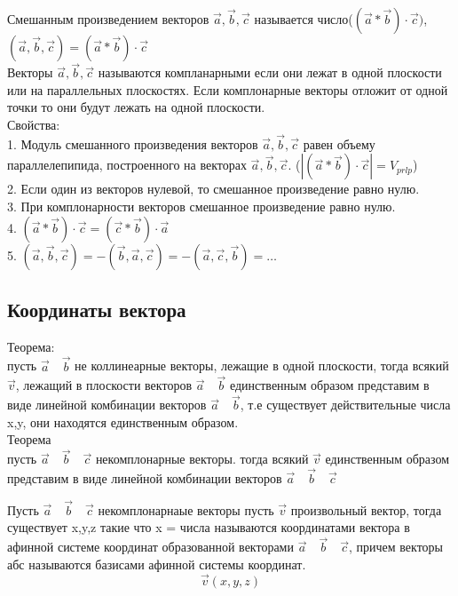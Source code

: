 \documentclass[a4paper, 12pt]{article}
\begin{document}
Смешанным произведением векторов $ \vec{a},\vec{b},\vec{c} $ называется число($ (\vec{a}*\vec{b})\cdot \vec{c}) $, $ (\vec{a},\vec{b},\vec{c}) = (\vec{a}*\vec{b})\cdot \vec{c} $\\

Векторы $  \vec{a},\vec{b},\vec{c} $ называются компланарными если они лежат в одной плоскости или на параллельных плоскостях. Если комплонарные векторы отложит от одной точки то они будут лежать на одной плоскости.\\

Свойства:\\
1. Модуль смешанного произведения векторов $  \vec{a},\vec{b},\vec{c} $ равен объему параллелепипида, построенного на векторах $  \vec{a},\vec{b},\vec{c} $. ($  |(\vec{a}*\vec{b})\cdot\vec{c}|  = V_{prlp} $)\\
2. Если один из векторов нулевой, то смешанное произведение равно нулю. \\
3. При комплонарности векторов смешанное произведение равно нулю.\\
4. $ (\vec{a}*\vec{b})\cdot\vec{c} = (\vec{c}*\vec{b})\cdot\vec{a} $\\
5. $ (\vec{a},\vec{b},\vec{c}) =  -(\vec{b},\vec{a},\vec{c}) = -(\vec{a},\vec{c},\vec{b}) = \ldots $

\subsection{Координаты вектора}

\begin{mdframed}[backgroundcolor=blue!20] 
       Теорема:\\
       пусть $ \vec{a} \quad \vec{b} $ не коллинеарные векторы, лежащие в одной плоскости, тогда всякий $ \vec{v} $, лежащий в плоскости векторов $ \vec{a} \quad \vec{b} $ единственным образом представим в виде линейной комбинации векторов $ \vec{a} \quad \vec{b} $, т.е существует действительные числа x,y, они находятся единственным образом.\\

       Теорема\\
       пусть $ \vec{a} \quad \vec{b} \quad \vec{c}    $  некомплонарные векторы. тогда всякий $ \vec{v}  $ 	 единственным образом представим в виде линейной комбинации векторов $ \vec{a} \quad \vec{b} \quad \vec{c} $\\


    \end{mdframed}

Пусть $ \vec{a} \quad \vec{b} \quad \vec{c} $ некомплонарнаые векторы пусть $ \vec{v}  $  произвольный вектор, тогда существует x,y,z такие что x =  числа называются координатами вектора в афинной системе координат образованной векторами $ \vec{a} \quad \vec{b} \quad \vec{c}    $, причем векторы абс называются базисами афинной системы координат.
\[
	 \vec{v}(x,y,z)  
\]
\end{document}
